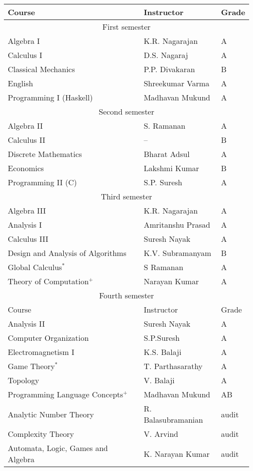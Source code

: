 \documentclass[a4paper]{amsart}
\begin{document}
\begin{tabular}{|l|l|l|}
  \hline
  Course & Instructor & Grade \\
  \hline
  \multicolumn{3}{|c|}{First semester}\\
  \hline
  Algebra I & K.R. Nagarajan & A \\
  Calculus I & D.S. Nagaraj & A \\
  Classical Mechanics & P.P. Divakaran & B\\
  English & Shreekumar Varma & A\\
  Programming I (Haskell) & Madhavan Mukund & A \\
  \hline
  \multicolumn{3}{|c|}{Second semester}\\
  \hline
  Algebra II & S. Ramanan & A \\
  Calculus II & -- & B \\
  Discrete Mathematics & Bharat Adsul & A\\
  Economics & Lakshmi Kumar & B\\
  Programming II (C) & S.P. Suresh & A \\
  \hline
  \multicolumn{3}{|c|}{Third semester}\\
  \hline
  Algebra III & K.R. Nagarajan & A\\
  Analysis I & Amritanshu Prasad & A\\
  Calculus III& Suresh Nayak & A\\
  Design and Analysis of Algorithms & K.V. Subramanyam & B\\
  Global Calculus$^*$ & S Ramanan & A\\
  Theory of Computation$^+$ & Narayan Kumar & A\\
  \hline
  \multicolumn{3}{|c|}{Fourth semester}\\
  \hline
  Course & Instructor & Grade\\
  \hline
  Analysis II & Suresh Nayak & A\\
  Computer Organization & S.P.Suresh & A\\
  Electromagnetism I & K.S. Balaji & A\\
  Game Theory$^*$ & T. Parthasarathy & A\\
  Topology & V. Balaji & A\\
  Programming Language Concepts$^+$ & Madhavan Mukund & AB\\
  Analytic Number Theory & R. Balasubramanian & audit\\
  Complexity Theory & V. Arvind & audit\\
  Automata, Logic, Games and Algebra & K. Narayan Kumar & audit\\
  \hline
\end{tabular}
\end{document}
